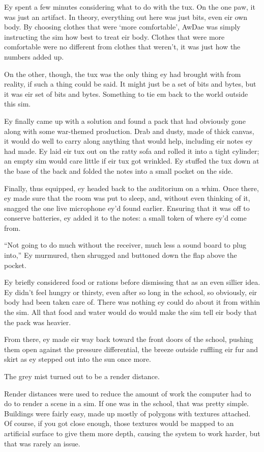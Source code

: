 Ey spent a few minutes considering what to do with the tux. On the one paw, it was just an artifact. In theory, everything out here was just bits, even eir own body. By choosing clothes that were `more comfortable', AwDae was simply instructing the sim how best to treat eir body. Clothes that were more comfortable were no different from clothes that weren't, it was just how the numbers added up.

On the other, though, the tux was the only thing ey had brought with from reality, if such a thing could be said. It might just be a set of bits and bytes, but it was eir set of bits and bytes. Something to tie em back to the world outside this sim.

Ey finally came up with a solution and found a pack that had obviously gone along with some war-themed production. Drab and dusty, made of thick canvas, it would do well to carry along anything that would help, including eir notes ey had made. Ey laid eir tux out on the ratty sofa and rolled it into a tight cylinder; an empty sim would care little if eir tux got wrinkled. Ey stuffed the tux down at the base of the back and folded the notes into a small pocket on the side.

Finally, thus equipped, ey headed back to the auditorium on a whim. Once there, ey made sure that the room was put to sleep, and, without even thinking of it, snagged the one live microphone ey'd found earlier. Ensuring that it was off to conserve batteries, ey added it to the notes: a small token of where ey'd come from.

``Not going to do much without the receiver, much less a sound board to plug into,'' Ey murmured, then shrugged and buttoned down the flap above the pocket.

Ey briefly considered food or rations before dismissing that as an even sillier idea. Ey didn't feel hungry or thirsty, even after so long in the school, so obviously, eir body had been taken care of. There was nothing ey could do about it from within the sim. All that food and water would do would make the sim tell eir body that the pack was heavier.

From there, ey made eir way back toward the front doors of the school, pushing them open against the pressure differential, the breeze outside ruffling eir fur and skirt as ey stepped out into the sun once more.

The grey mist turned out to be a render distance.

Render distances were used to reduce the amount of work the computer had to do to render a scene in a sim. If one was in the school, that was pretty simple. Buildings were fairly easy, made up mostly of polygons with textures attached. Of course, if you got close enough, those textures would be mapped to an artificial surface to give them more depth, causing the system to work harder, but that was rarely an issue.

